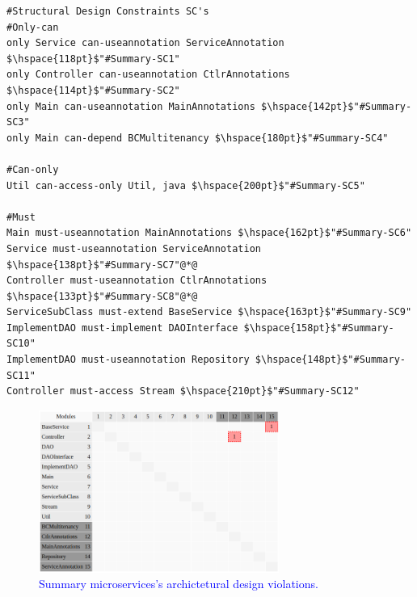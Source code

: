 \documentclass[12pt]{article}
\begin{document}
\begin{lstlisting}[style=colorido, caption={\textcolor{blue}{Summary microservice's architectural design specification.}},label={list:especArquiteturalSummary}
]
#Structural Design Constraints SC's
#Only-can
only Service can-useannotation ServiceAnnotation $\hspace{118pt}$"#Summary-SC1" 
only Controller can-useannotation CtlrAnnotations	$\hspace{114pt}$"#Summary-SC2"
only Main can-useannotation MainAnnotations	$\hspace{142pt}$"#Summary-SC3"
only Main can-depend BCMultitenancy $\hspace{180pt}$"#Summary-SC4"

#Can-only	
Util can-access-only Util, java $\hspace{200pt}$"#Summary-SC5"

#Must
Main must-useannotation MainAnnotations	$\hspace{162pt}$"#Summary-SC6"
Service must-useannotation ServiceAnnotation $\hspace{138pt}$"#Summary-SC7"@*@
Controller must-useannotation CtlrAnnotations $\hspace{133pt}$"#Summary-SC8"@*@
ServiceSubClass must-extend BaseService	$\hspace{163pt}$"#Summary-SC9"
ImplementDAO must-implement DAOInterface $\hspace{158pt}$"#Summary-SC10"
ImplementDAO must-useannotation Repository $\hspace{148pt}$"#Summary-SC11"
Controller must-access Stream $\hspace{210pt}$"#Summary-SC12"
\end{lstlisting}
\begin{figure}[ht]
\centering
\includegraphics[width=0.7\textwidth]{figuras/violacoesSummary.png}
\caption{\textcolor{blue}{Summary microservices's archictetural design violations.}}
\label{fig:microservices}
\end{figure}
% 
\end{document}
